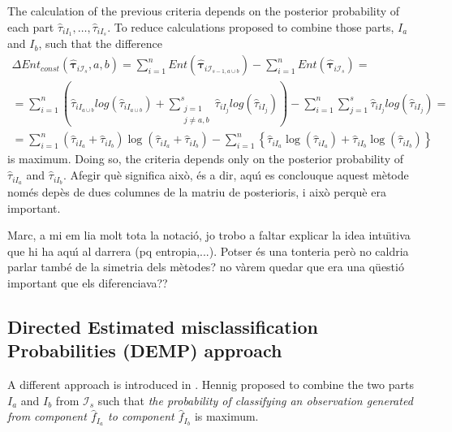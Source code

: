 \documentclass[10pt, a4paper]{article}
\newcommand{\m}[1]{\boldsymbol{#1}}
\begin{document}
The calculation of the previous criteria depends on the posterior probability of each part $\hat{\tau}_{iI_1}, \dots,\hat{\tau}_{iI_s}$. To reduce calculations \cite{baudry2010combining} proposed to combine those parts, $I_a$ and $I_b$, such that the difference
\begin{multline*}
\Delta Ent_{const}(\hat{\m \tau}_{i \mathcal{I}_s}, a, b) = \sum_{i=1}^n Ent( \hat{\m \tau}_{i \mathcal{I}_{s-1, a \cup b}}) - \sum_{i=1}^n Ent( \hat{\m \tau}_{i \mathcal{I}_s}) =  \\ = \sum_{i=1}^n  \left( \hat{\tau}_{i I_{a\cup b}}  log(\hat{\tau}_{i I_{a\cup b}} ) +  \sum_{\substack{j=1 \\
                                                            j \neq a, b}}^s \hat{\tau}_{i I_j}  log(\hat{\tau}_{i I_j} ) \right)  - \sum_{i=1}^n \sum_{j=1}^s \hat{\tau}_{i I_j}  log(\hat{\tau}_{i I_j} ) = \\  =   \sum_{i=1}^n  (\hat{\tau}_{iI_a}+\hat{\tau}_{iI_b}) \log(\hat{\tau}_{iI_a} + \hat{\tau}_{iI_b}) - \sum_{i=1}^n \left\{ \hat{\tau}_{iI_a} \log(\hat{\tau}_{iI_a}) + \hat{\tau}_{iI_b} \log(\hat{\tau}_{iI_b})\right\}
\end{multline*}
is maximum. Doing so, the criteria depends only on the posterior probability of $\hat{\tau}_{iI_a}$ and $\hat{\tau}_{iI_b}$. {\color{blue} Afegir qu\`{e} significa aix\`{o}, \'{e}s a dir, aqu\'{\i} es conclouque aquest m\`{e}tode nom\'{e}s dep\`{e}s de dues columnes de la matriu de posterioris, i aix\`{o} perqu\`{e} era important.}

{\color{blue} Marc, a mi em lia molt tota la notaci\'{o}, jo trobo a faltar explicar la idea intu\"{\i}tiva que hi ha aqu\'{\i} al darrera (pq entropia,...). Potser \'{e}s una tonteria per\`{o} no caldria parlar tamb\'{e} de la simetria dels m\`{e}todes? no v\`{a}rem quedar que era una q\"{u}esti\'{o} important que els diferenciava??}

\subsection{Directed Estimated misclassification Probabilities (DEMP) approach}

A different approach is introduced in \cite{hennig2010methods}. Hennig proposed to combine the two parts $I_a$ and $I_b$ from $ \mathcal{I}_s$ such that \emph{the probability of classifying an observation generated from component $\hat{f}_{I_a}$ to component $\hat{f}_{I_b}$} is maximum.
\end{document}
